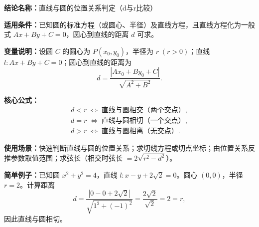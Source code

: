 \textbf{结论名称：}直线与圆的位置关系判定（d与r比较）

\textbf{适用条件：}已知圆的标准方程（或圆心、半径）及直线方程，且直线方程化为一般式 \(Ax+By+C=0\)，圆心到直线的距离 \(d\) 可求。

\textbf{变量说明：}设圆 \(C\) 的圆心为 \(P(x_0,y_0)\)，半径为 \(r\;(r>0)\)；直线 \(l:Ax+By+C=0\)；圆心到直线的距离为
\[
d = \frac{|Ax_0+By_0+C|}{\sqrt{A^2+B^2}}.
\]

\textbf{核心公式：}
\[
\boxed{
\begin{array}{c}
d<r \;\Longleftrightarrow\; \text{直线与圆相交（两个交点）},\\
d=r \;\Longleftrightarrow\; \text{直线与圆相切（一个交点）},\\
d>r \;\Longleftrightarrow\; \text{直线与圆相离（无交点）}.
\end{array}
}
\]

\textbf{使用场景：}快速判断直线与圆的位置关系；求切线方程或切点坐标；由位置关系反推参数取值范围；求弦长（相交时弦长 \(=2\sqrt{r^2-d^2}\)）。

\textbf{简单例子：}已知圆 \(x^2+y^2=4\)，直线 \(l:x-y+2\sqrt{2}=0\)。圆心 \((0,0)\)，半径 \(r=2\)。计算距离
\[
d=\frac{|0-0+2\sqrt{2}|}{\sqrt{1^2+(-1)^2}}=\frac{2\sqrt{2}}{\sqrt{2}}=2=r,
\]
因此直线与圆相切。